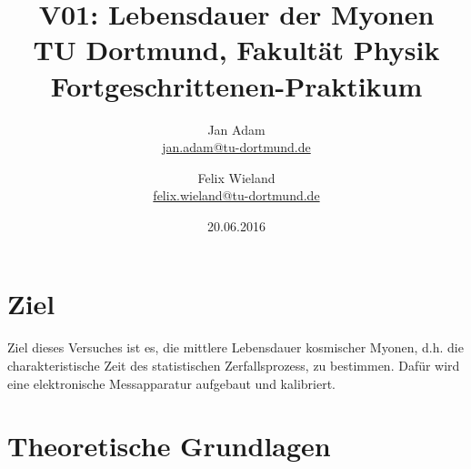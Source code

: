



\title{V01: Lebensdauer der Myonen\\				%
	\large TU Dortmund, Fakultät Physik\\ 
	\normalsize Fortgeschrittenen-Praktikum}

\author{Jan Adam\\			%
	{\small \href{jan.adam@tu-dortmund.de}{jan.adam@tu-dortmund.de}}	%
	\and						%
	Felix Wieland\\					%
	{\small \href{felix.wieland@tu-dortmund.de}{felix.wieland@tu-dortmund.de}}		%
}
\date{20.06.2016}				%



	

\maketitle					%
\thispagestyle{empty} 				%


\tableofcontents
\newpage					%

\section{Ziel}
Ziel dieses Versuches ist es, die mittlere Lebensdauer kosmischer Myonen, d.h. die  charakteristische Zeit des statistischen Zerfallsprozess, zu bestimmen. Dafür wird eine elektronische Messapparatur aufgebaut und kalibriert. 

\section{Theoretische Grundlagen}
